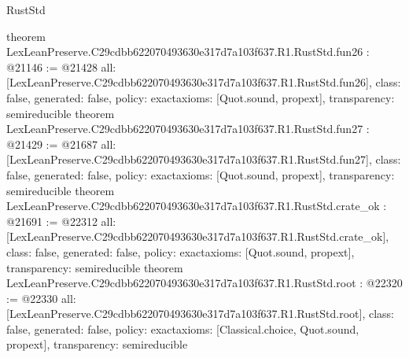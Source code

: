 \begin{lexlean}{RustStd}
\begin{coremodule}
{}
theorem LexLeanPreserve.C29cdbb622070493630e317d7a103f637.R1.RustStd.fun26 : @21146 := @21428 {
  all: [LexLeanPreserve.C29cdbb622070493630e317d7a103f637.R1.RustStd.fun26],
  class: false,
  generated: false,
  policy: exact{axioms: [Quot.sound, propext]},
  transparency: semireducible
}
theorem LexLeanPreserve.C29cdbb622070493630e317d7a103f637.R1.RustStd.fun27 : @21429 := @21687 {
  all: [LexLeanPreserve.C29cdbb622070493630e317d7a103f637.R1.RustStd.fun27],
  class: false,
  generated: false,
  policy: exact{axioms: [Quot.sound, propext]},
  transparency: semireducible
}
theorem LexLeanPreserve.C29cdbb622070493630e317d7a103f637.R1.RustStd.crate_ok : @21691 := @22312 {
  all: [LexLeanPreserve.C29cdbb622070493630e317d7a103f637.R1.RustStd.crate_ok],
  class: false,
  generated: false,
  policy: exact{axioms: [Quot.sound, propext]},
  transparency: semireducible
}
theorem LexLeanPreserve.C29cdbb622070493630e317d7a103f637.R1.RustStd.root : @22320 := @22330 {
  all: [LexLeanPreserve.C29cdbb622070493630e317d7a103f637.R1.RustStd.root],
  class: false,
  generated: false,
  policy: exact{axioms: [Classical.choice, Quot.sound, propext]},
  transparency: semireducible
}


\end{coremodule}
\end{lexlean}

